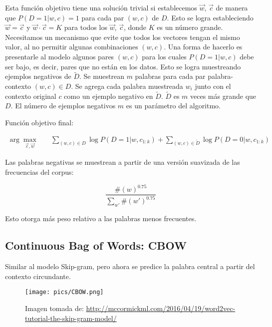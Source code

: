 Esta función objetivo tiene una solución trivial si establecemos $\vec{w}$, $\vec{c}$ de manera que $P(D=1|w,c)=1$ para cada par $(w,c)$ de $D$.
Esto se logra estableciendo $\vec{w}=\vec{c}$ y $\vec{w} \cdot \vec{c} = K$ para todos los $\vec{w}$, $\vec{c}$, donde $K$ es un número grande.
Necesitamos un mecanismo que evite que todos los vectores tengan el mismo valor, al no permitir algunas combinaciones $(w, c)$.
Una forma de hacerlo es presentarle al modelo algunos pares $(w, c)$ para los cuales $P(D=1|w, c)$ debe ser bajo, es decir, pares que no están en los datos.
Esto se logra muestreando ejemplos negativos de $\tilde{D}$.
Se muestrean $m$ palabras para cada par palabra-contexto $(w,c) \in D$.
Se agrega cada palabra muestreada $w_i$ junto con el contexto original $c$ como un ejemplo negativo en $\tilde{D}$.
$\tilde{D}$ es $m$ veces más grande que $D$.
El número de ejemplos negativos $m$ es un parámetro del algoritmo.

Función objetivo final:

\begin{equation}
\begin{split}
\operatorname{arg} \max_{\vec{c}, \vec{w}} & \quad \sum_{(w,c) \in D}{\log P(D = 1| w,c_{1:k})} + \sum_{(w,c) \in \tilde{D}} \log P(D = 0| w,c_{1:k})
\end{split}
\end{equation}

Las palabras negativas se muestrean a partir de una versión suavizada de las frecuencias del corpus:

\begin{displaymath}
\frac{\#(w)^{0.75}}{\sum_{w'}\#(w')^{0.75}}
\end{displaymath}

Esto otorga más peso relativo a las palabras menos frecuentes.

\subsection{Continuous Bag of Words: CBOW}

Similar al modelo Skip-gram, pero ahora se predice la palabra central a partir del contexto circundante.

\begin{figure}[h]
	\centering
	\texttt{[image: pics/CBOW.png]}
	\caption{Imagen tomada de: \url{http://mccormickml.com/2016/04/19/word2vec-tutorial-the-skip-gram-model/}}
\end{figure}


